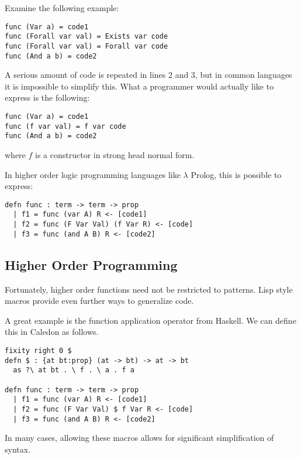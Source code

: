 Examine the following example:

\begin{lstlisting}
func (Var a) = code1
func (Forall var val) = Exists var code
func (Forall var val) = Forall var code
func (And a b) = code2
\end{lstlisting}

A serious amount of code is repeated in lines 2 and 3, but in common languages it is impossible to simplify this.
What a programmer would actually like to express is the following:

\begin{lstlisting}
func (Var a) = code1
func (f var val) = f var code
func (And a b) = code2
\end{lstlisting}

where $f$ is a constructor in strong head normal form.  

In higher order logic programming languages like $\lambda$ Prolog, this is possible to express:

\begin{lstlisting}
defn func : term -> term -> prop 
  | f1 = func (var A) R <- [code1]
  | f2 = func (F Var Val) (f Var R) <- [code]
  | f3 = func (and A B) R <- [code2]
\end{lstlisting}


\subsection{Higher Order Programming}

Fortunately, higher order functions need not be restricted to patterns.  Lisp style macros provide even further ways
to generalize code.  

A great example is the function application operator from Haskell.  
We can define this in Caledon as follows.

\begin{lstlisting}
fixity right 0 $
defn $ : {at bt:prop} (at -> bt) -> at -> bt
  as ?\ at bt . \ f . \ a . f a

defn func : term -> term -> prop 
  | f1 = func (var A) R <- [code1]
  | f2 = func (F Var Val) $ f Var R <- [code]
  | f3 = func (and A B) R <- [code2]
\end{lstlisting}

In many cases, allowing these macros allows for significant simplification of syntax.
